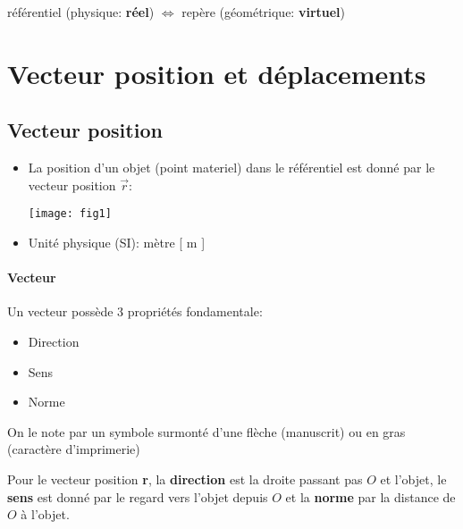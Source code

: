 \documentclass[
    11pt,
    a4paper,
    oneside,
    headinlcude, footinclude,
    twoside,
]{report}
\renewcommand{\vec}[1]{\overrightarrow{#1}}
\newcommand\Warning{
    \makebox[1.4em][c]{
    \makebox[-5.5pt][c]{\raisebox{.2em}{!}}
    \makebox[0pt][c]{\color{red}\huge$\bigtriangleup$}}
}
\begin{document}
\Warning référentiel (physique: \textbf{réel})  $\iff$ repère (géométrique:
\textbf{virtuel}) \Warning

\section{Vecteur position et déplacements}
\label{sec:vecteur_position_et_deplacements}

\subsection{Vecteur position}
\label{sub:vecteur_position}

\begin{itemize}
\item La position d'un objet (point materiel) dans le référentiel est
donné par le vecteur position $\vec r$:
\begin{center}
\texttt{[image: fig1]}
\end{center}

\item Unité physique (SI): mètre [ m ]
\end{itemize}

\paragraph{Vecteur}
\label{par:vecteur}

Un vecteur possède 3 propriétés fondamentale:

\begin{itemize}
\item Direction
\item Sens
\item Norme
\end{itemize}

On le note par un symbole surmonté d'une flèche (manuscrit) ou en gras
(caractère d'imprimerie)

Pour le vecteur position \textbf{r}, la \textbf{direction} est la droite
passant pas $O$ et l'objet, le \textbf{sens} est donné par le regard vers
l'objet depuis $O$ et la \textbf{norme} par la distance de $O$ à l'objet.
\end{document}
